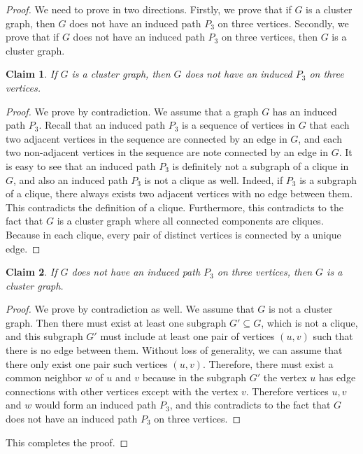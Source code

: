 \documentclass{article}
\newtheorem{claim}{Claim}
\begin{document}
\begin{proof}
We need to prove in two directions. Firstly, we prove that if \(G\) is a cluster graph, then \(G\) does not have an induced path \(P_3\) on three vertices. Secondly, we prove that if \(G\) does not have an induced path \(P_3\) on three vertices, then \(G\) is a cluster graph.

\begin{claim}
If \(G\) is a cluster graph, then \(G\) does not have an induced \(P_3\) on three vertices.
\end{claim}

\begin{proof}
We prove by contradiction. We assume that a graph \(G\) has an induced path \(P_3\). Recall that an induced path \(P_3\) is a sequence of vertices in \(G\) that each two adjacent vertices in the sequence are connected by an edge in \(G\), and each two non-adjacent vertices in the sequence are note connected by an edge in \(G\). It is easy to see that an induced path \(P_3\) is definitely not a subgraph of a clique in \(G\), and also an induced path \(P_3\) is not a clique as well. Indeed, if \(P_3\) is a subgraph of a clique, there always exists two adjacent vertices with no edge between them. This contradicts the definition of a clique. Furthermore, this contradicts to the fact that \(G\) is a cluster graph where all connected components are cliques. Because in each clique, every pair of distinct vertices is connected by a unique edge.
\end{proof}

\begin{claim}
If \(G\) does not have an induced path \(P_3\) on three vertices, then \(G\) is a cluster graph.
\end{claim}

\begin{proof}
We prove by contradiction as well. We assume that \(G\) is not a cluster graph. Then there must exist at least one subgraph \(G' \subseteq G\), which is not a clique, and this subgraph \(G'\) must include at least one pair of vertices \((u,v)\) such that there is no edge between them. Without loss of generality, we can assume that there only exist one pair such vertices \((u,v)\). Therefore, there must exist a common neighbor \(w\) of \(u\) and \(v\) because in the subgraph \(G'\) the vertex \(u\) has edge connections with other vertices except with the vertex \(v\). Therefore vertices \(u,v\) and \(w\) would form an induced path \(P_3\), and this contradicts to the fact that \(G\) does not have an induced path \(P_3\) on three vertices.
\end{proof}
This completes the proof.
\end{proof}
\end{document}
